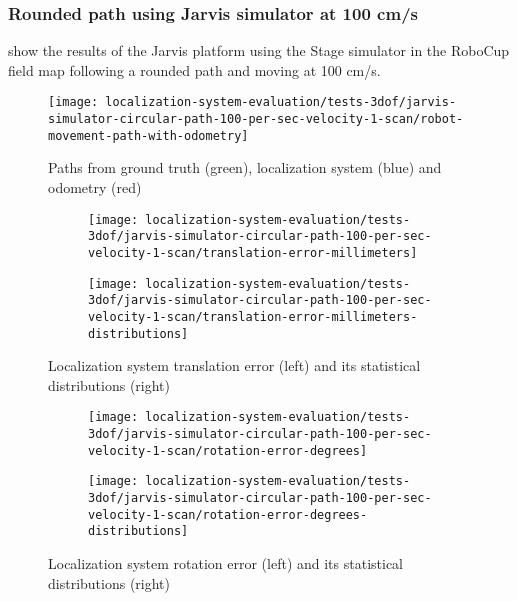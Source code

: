 \subsubsection{Rounded path using Jarvis simulator at 100 cm/s}

 show the results of the Jarvis platform using the Stage simulator in the RoboCup field map following a rounded path and moving at 100 cm/s.

\begin{figure}[H]
	\centering
	\texttt{[image: localization-system-evaluation/tests-3dof/jarvis-simulator-circular-path-100-per-sec-velocity-1-scan/robot-movement-path-with-odometry]}
	\caption{Paths from ground truth (green), localization system (blue) and odometry (red)}
	\label{fig:localization-system-evaluation_jarvis-simulator-circular-path-100-per-sec-velocity-1-scan}
\end{figure}

\begin{figure}[H]
	\centering
	\begin{subfigure}[h]{0.47\textwidth}
		\centering
		\texttt{[image: localization-system-evaluation/tests-3dof/jarvis-simulator-circular-path-100-per-sec-velocity-1-scan/translation-error-millimeters]}
	\end{subfigure}
	\begin{subfigure}[h]{0.47\textwidth}
		\centering
		\texttt{[image: localization-system-evaluation/tests-3dof/jarvis-simulator-circular-path-100-per-sec-velocity-1-scan/translation-error-millimeters-distributions]}
	\end{subfigure}
	\caption{Localization system translation error (left) and its statistical distributions (right)}
	\label{fig:localization-system-evaluation_jarvis-simulator-circular-path-100-per-sec-velocity-1-scan_translation-errors}
\end{figure}

\begin{figure}[H]
	\centering
	\begin{subfigure}[h]{0.47\textwidth}
		\centering
		\texttt{[image: localization-system-evaluation/tests-3dof/jarvis-simulator-circular-path-100-per-sec-velocity-1-scan/rotation-error-degrees]}
	\end{subfigure}
	\begin{subfigure}[h]{0.47\textwidth}
		\centering
		\texttt{[image: localization-system-evaluation/tests-3dof/jarvis-simulator-circular-path-100-per-sec-velocity-1-scan/rotation-error-degrees-distributions]}
	\end{subfigure}
	\caption{Localization system rotation error (left) and its statistical distributions (right)}
	\label{fig:localization-system-evaluation_jarvis-simulator-circular-path-100-per-sec-velocity-1-scan_rotation-errors}
\end{figure}

